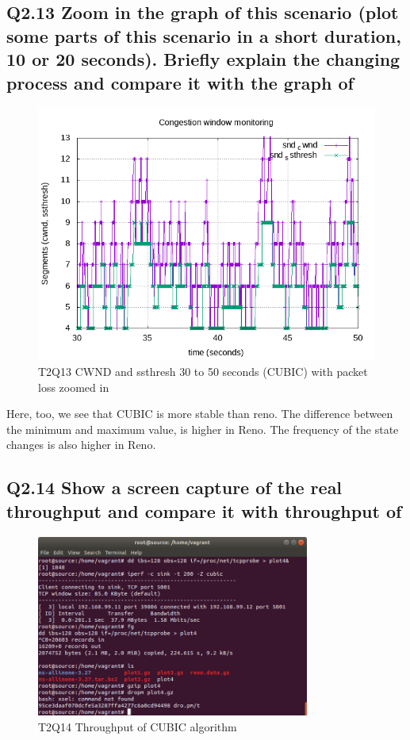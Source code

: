 \documentclass{article}
\begin{document}
\subsection{Q2.13 Zoom in the graph of this scenario (plot some parts of this scenario in a short duration, 10 or 20 seconds). Briefly explain the changing process and compare it with the graph of}

\begin{figure}[H]
	\includegraphics{lab1-group1-task2-question13-xrange-30-50.png}
	\caption{T2Q13 CWND and ssthresh 30 to 50 seconds (CUBIC) with packet loss zoomed in}
\end{figure}

Here, too, we see that CUBIC is more stable than reno. The difference between
the minimum and maximum value, is higher in Reno. The frequency of the state
changes is also higher in Reno.


\subsection{Q2.14 Show a screen capture of the real throughput and compare it with throughput of}

\begin{figure}[H]
	\includegraphics[width=0.8\textwidth]{lab1-group1-task2-question14.png}
	\caption{T2Q14 Throughput of CUBIC algorithm}
\end{figure}
\end{document}
